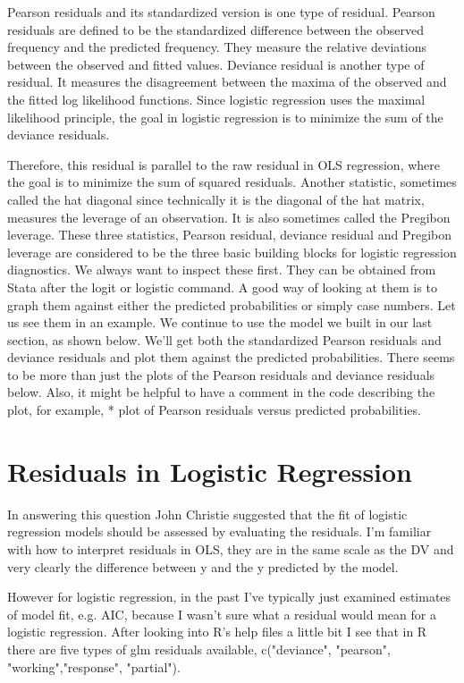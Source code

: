 Pearson residuals and its standardized version is one type of residual. Pearson residuals are defined to be the standardized difference between the observed frequency and the predicted frequency. They measure the relative deviations between the observed and fitted values. Deviance residual is another type of residual. It measures the disagreement between the maxima of the observed and the fitted log likelihood functions. Since logistic regression uses the maximal likelihood principle, the goal in logistic regression is to minimize the sum of the deviance residuals. 

Therefore, this residual is parallel to the raw residual in OLS regression, where the goal is to minimize the sum of squared residuals. Another statistic, sometimes called the hat diagonal since technically it is the diagonal of the hat matrix, measures the leverage of an observation. It is also sometimes called the Pregibon leverage. These three statistics, Pearson residual, deviance residual and Pregibon leverage are considered to be the three basic building blocks for logistic regression diagnostics. We always want to inspect these first. They can be obtained from Stata after the logit or logistic command. A good way of looking at them is to graph them against either the predicted probabilities or simply case numbers. Let us see them in an example. We continue to use the model we built in our last section, as shown below. We'll get both the standardized Pearson residuals and deviance residuals and plot them against the predicted probabilities. There seems to be more than just the plots of the Pearson residuals and deviance residuals below. Also, it might be helpful to have a comment in the code describing the plot, for example, * plot of Pearson residuals versus predicted probabilities.


\section{Residuals in Logistic Regression}
In answering this question John Christie suggested that the fit of logistic regression models should be assessed by evaluating the residuals. I'm familiar with how to interpret residuals in OLS, they are in the same scale as the DV and very clearly the difference between y and the y predicted by the model. 

However for logistic regression, in the past I've typically just examined estimates of model fit, e.g. AIC, because I wasn't sure what a residual would mean for a logistic regression. After looking into R's help files a little bit I see that in R there are five types of glm residuals available, c("deviance", "pearson", "working","response", "partial"). 

